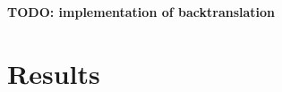 \documentclass[11pt,a4paper]{article}
\begin{document}


\textbf{TODO: implementation of backtranslation}

\section{Results}\label{sec:results}
\end{document}

